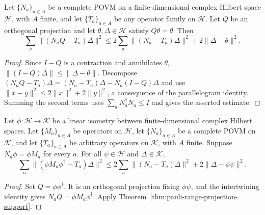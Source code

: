 \begin{theorem}\label{thm:pauli-range-projection-support}
  \leanok
  Let $\{N_a\}_{a\in A}$ be a complete POVM on a finite-dimensional complex
  Hilbert space $\mathcal H$, with $A$ finite, and let $\{T_a\}_{a\in A}$ be
  any operator family on $\mathcal H$. Let $Q$ be an orthogonal projection
  and let $\theta,\Delta\in\mathcal H$ satisfy $Q\theta=\theta$. Then
  \[
    \sum_a\|(N_aQ-T_a)\Delta\|^2
    \le 2\sum_a\|(N_a-T_a)\Delta\|^2+2\|\Delta-\theta\|^2.
  \]
\end{theorem}
\begin{proof}
  \leanok
  Since $I-Q$ is a contraction and annihilates $\theta$,
  $\|(I-Q)\Delta\|\le\|\Delta-\theta\|$.
  Decompose $(N_aQ-T_a)\Delta=(N_a-T_a)\Delta-N_a(I-Q)\Delta$
  and use $\|x-y\|^2\le2\|x\|^2+2\|y\|^2$, a consequence of the
  parallelogram identity. Summing the second terms uses
  $\sum_a N_a^\dagger N_a\le I$ and gives the asserted estimate.
\end{proof}

\begin{theorem}\label{thm:pauli-isometry-transfer-support}
  \leanok
  Let $\phi\colon\mathcal H\to\mathcal K$ be a linear isometry between
  finite-dimensional complex Hilbert spaces. Let $\{M_a\}_{a\in A}$ be
  operators on $\mathcal H$, let $\{N_a\}_{a\in A}$ be a complete POVM on
  $\mathcal K$, and let $\{T_a\}_{a\in A}$ be arbitrary operators on
  $\mathcal K$, with $A$ finite. Suppose $N_a\phi=\phi M_a$ for every $a$.
  For all $\psi\in\mathcal H$ and $\Delta\in\mathcal K$,
  \[
    \sum_a\|(\phi M_a\phi^\dagger-T_a)\Delta\|^2
    \le2\sum_a\|(N_a-T_a)\Delta\|^2+2\|\Delta-\phi\psi\|^2.
  \]
\end{theorem}
\begin{proof}
  \leanok
  Set $Q=\phi\phi^\dagger$. It is an orthogonal projection fixing
  $\phi\psi$, and the intertwining identity gives
  $N_aQ=\phi M_a\phi^\dagger$. Apply
  Theorem~\ref{thm:pauli-range-projection-support}.
\end{proof}

